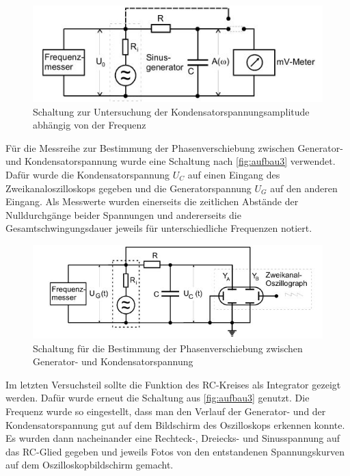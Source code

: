 \begin{figure}
    \centering
    \includegraphics{images/SchaltungFrequenz.JPG}
    \caption{Schaltung zur Untersuchung der Kondensatorspannungsamplitude abhängig von der Frequenz \cite{VA}}
    \label{fig:aufbau2}
\end{figure}
Für die Messreihe zur Bestimmung der Phasenverschiebung zwischen Generator- und Kondensatorspannung wurde eine Schaltung nach \autoref{fig:aufbau3} verwendet. Dafür wurde die Kondensatorspannung $U_C$ auf einen Eingang des 
Zweikanaloszilloskops gegeben und die Generatorspannung $U_G$ auf den anderen Eingang. Als Messwerte wurden einerseits die zeitlichen Abstände der Nulldurchgänge beider Spannungen und andererseits die Gesamtschwingungsdauer jeweils für unterschiedliche Frequenzen notiert. \newline
\begin{figure}
    \centering
    \includegraphics{images/SchaltungPhaVersch.JPG}
    \caption{Schaltung für die Bestimmung der Phasenverschiebung zwischen Generator- und Kondensatorspannung \cite{VA}}
    \label{fig:aufbau3}
\end{figure}
Im letzten Versuchsteil sollte die Funktion des RC-Kreises als Integrator gezeigt werden. Dafür wurde erneut die Schaltung aus \autoref{fig:aufbau3} genutzt. Die Frequenz wurde so eingestellt, dass man den Verlauf der Generator- und der Kondensatorspannung gut auf dem Bildschirm des Oszilloskops erkennen konnte. Es wurden dann nacheinander eine Rechteck-, Dreiecks- und Sinusspannung auf das RC-Glied gegeben und jeweils Fotos von den entstandenen Spannungskurven auf dem Oszilloskopbildschirm gemacht.